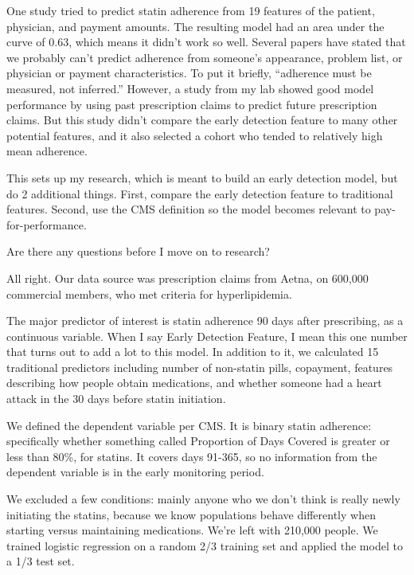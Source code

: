 \documentclass[12pt]{report}
\begin{document}
\begin{large}
One study tried to predict statin adherence from 19 features of the
patient, physician, and payment amounts. The resulting model had an
area under the curve of 0.63, which means it didn't work so well.
Several papers have stated that we probably can't predict adherence
from someone's appearance, problem list, or physician or payment
characteristics. To put it briefly, ``adherence must be measured, not
inferred.'' However, a study from my lab showed good model performance
by using past prescription claims to predict future prescription
claims. But this study didn't compare the early detection feature to
many other potential features, and it also selected a cohort who
tended to relatively high mean adherence.

This sets up my research, which is meant to build an early detection
model, but do 2 additional things. First, compare the early detection
feature to traditional features. Second, use the CMS definition so the
model becomes relevant to pay-for-performance.

Are there any questions before I move on to research?







All right. Our data source was prescription claims from Aetna, on
600,000 commercial members, who met criteria for hyperlipidemia.

The major predictor of interest is statin adherence 90 days after
prescribing, as a continuous variable. When I say Early Detection
Feature, I mean this one number that turns out to add a lot to this
model. In addition to it, we calculated 15 traditional predictors
including number of non-statin pills, copayment, features describing
how people obtain medications, and whether someone had a heart attack
in the 30 days before statin initiation.

We defined the dependent variable per CMS. It is binary statin
adherence: specifically whether something called Proportion of Days
Covered is greater or less than 80\%, for statins. It covers days
91-365, so no information from the dependent variable is in the early
monitoring period.

We excluded a few conditions: mainly anyone who we don't think is
really newly initiating the statins, because we know populations
behave differently when starting versus maintaining medications. We're
left with 210,000 people. We trained logistic regression on a random
2/3 training set and applied the model to a 1/3 test set.


\end{large}
\end{document}

